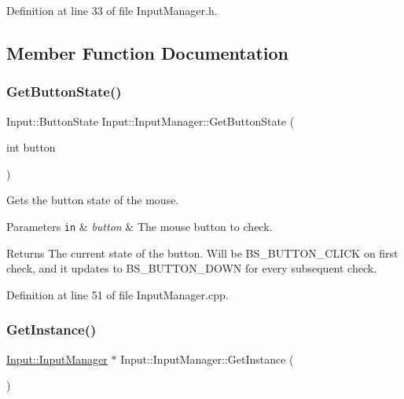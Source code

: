 Definition at line 33 of file Input\+Manager.\+h.



\subsection{Member Function Documentation}
\mbox{\label{class_input_1_1_input_manager_a42a6d92229690b8dc363dbf3012d20e1}} 
\subsubsection{\texorpdfstring{Get\+Button\+State()}{GetButtonState()}}
{\footnotesize\ttfamily Input\+::\+Button\+State Input\+::\+Input\+Manager\+::\+Get\+Button\+State (\begin{DoxyParamCaption}\item[{int}]{button }\end{DoxyParamCaption})}

Gets the button state of the mouse. 
\begin{DoxyParams}[1]{Parameters}
\mbox{\tt in}  & {\em button} & The mouse button to check. \\
\hline
\end{DoxyParams}
\begin{DoxyReturn}{Returns}
The current state of the button. Will be B\+S\+\_\+\+B\+U\+T\+T\+O\+N\+\_\+\+C\+L\+I\+CK on first check, and it updates to B\+S\+\_\+\+B\+U\+T\+T\+O\+N\+\_\+\+D\+O\+WN for every subsequent check. 
\end{DoxyReturn}


Definition at line 51 of file Input\+Manager.\+cpp.

\mbox{\label{class_input_1_1_input_manager_ac4df9b50e7cfc4e59f061a08ed7f4925}} 
\subsubsection{\texorpdfstring{Get\+Instance()}{GetInstance()}}
{\footnotesize\ttfamily \hyperlink{class_input_1_1_input_manager}{Input\+::\+Input\+Manager} $\ast$ Input\+::\+Input\+Manager\+::\+Get\+Instance (\begin{DoxyParamCaption}{ }\end{DoxyParamCaption})\hspace{0.3cm}{\ttfamily [static]}}

